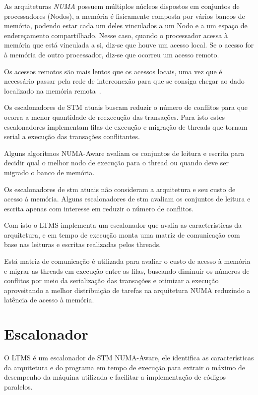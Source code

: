 \documentclass[diss,capa]{texufpel}
\begin{document}
As arquiteturas \emph{NUMA} possuem múltiplos núcleos dispostos em conjuntos de processadores (Nodos), a memória é fisicamente composta por vários bancos de memória, podendo estar cada um deles vinculados a um Nodo e a um espaço de endereçamento compartilhado. Nesse caso, quando o processador acessa à memória que está vinculada a si, diz-se que houve um acesso local. Se o acesso for à memória de outro processador, diz-se que ocorreu um acesso remoto.

Os acessos remotos são mais lentos que os acessos locais, uma vez que é necessário passar pela rede de interconexão para que se consiga chegar ao dado localizado na memória remota~\cite{Rodolfo:2014}.

Os escalonadores de STM atuais buscam reduzir o número de conflitos para que ocorra a menor quantidade de reexecução das transações. Para isto estes escalonadores implementam filas de execução e migração de threads que tornam serial a execução das transações conflitantes.

Alguns algoritmos NUMA-Aware avaliam os conjuntos de leitura e escrita para decidir qual o melhor nodo de execução para o thread ou quando deve ser migrado o banco de memória.

Os escalonadores de stm atuais não consideram a arquitetura e seu custo de acesso à memória. Alguns escalonadores de stm avaliam os conjuntos de leitura e escrita apenas com interesse em reduzir o número de conflitos.

Com isto o LTMS implementa um escalonador que avalia as características da arquitetura, e em tempo de execução monta uma matriz de comunicação com base nas leituras e escritas realizadas pelos threads.

Está matriz de comunicação é utilizada para avaliar o custo de acesso à memória e migrar as threads em execução entre as filas, buscando diminuir os números de conflitos por meio da serialização das transações e otimizar a execução aproveitando a melhor distribuição de tarefas na arquitetura NUMA reduzindo a latência de acesso à memória.

\section{\textbf{Escalonador}}

O LTMS é um escalonador de STM NUMA-Aware, ele identifica as características da arquitetura e do programa em tempo de execução para extrair o máximo de desempenho da máquina utilizada e facilitar a implementação de códigos paralelos.
\end{document}
